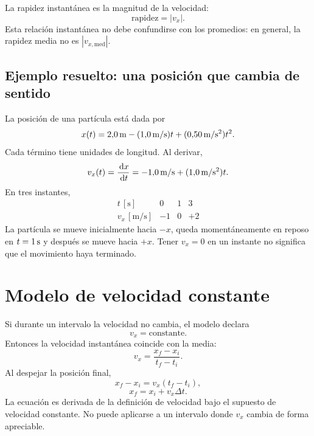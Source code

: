 \documentclass[11pt]{article}
\begin{document}
La rapidez instantánea es la magnitud de la velocidad:
\[
  \text{rapidez}=|v_x|.
\]
Esta relación instantánea no debe confundirse con los promedios: en general,
la rapidez media no es \(|v_{x,\mathrm{med}}|\).

\subsection{Ejemplo resuelto: una posición que cambia de sentido}

La posición de una partícula está dada por
\[
  x(t)
  =
  2{,}0\,\mathrm{m}
  -(1{,}0\,\mathrm{m/s})t
  +(0{,}50\,\mathrm{m/s^2})t^2.
\]
Cada término tiene unidades de longitud. Al derivar,
\[
  v_x(t)
  =
  \frac{\,\mathrm{d} x}{\,\mathrm{d} t}
  =
  -1{,}0\,\mathrm{m/s}
  +(1{,}0\,\mathrm{m/s^2})t.
\]
En tres instantes,
\[
\begin{array}{c|ccc}
t\,[\mathrm{s}] & 0 & 1 & 3\\
\hline
v_x\,[\mathrm{m/s}] & -1 & 0 & +2
\end{array}
\]
La partícula se mueve inicialmente hacia \(-x\), queda momentáneamente en
reposo en \(t=1\,\mathrm{s}\) y después se mueve hacia \(+x\). Tener
\(v_x=0\) en un instante no significa que el movimiento haya terminado.

\section{Modelo de velocidad constante}

Si durante un intervalo la velocidad no cambia, el modelo declara
\[
  v_x=\text{constante}.
\]
Entonces la velocidad instantánea coincide con la media:
\[
  v_x
  =
  \frac{x_f-x_i}{t_f-t_i}.
\]
Al despejar la posición final,
\[
  x_f-x_i=v_x(t_f-t_i),
\]
\[
  \boxed{x_f=x_i+v_x\Delta t}.
\]
La ecuación es derivada de la definición de velocidad bajo el supuesto de
velocidad constante. No puede aplicarse a un intervalo donde \(v_x\) cambia de
forma apreciable.

\begin{center}
\end{center}
\end{document}
